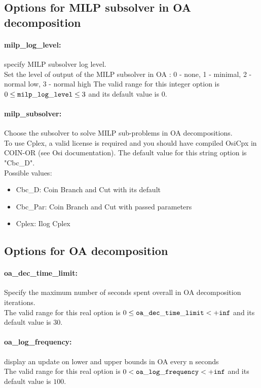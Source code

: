 \subsection{Options for MILP subsolver in OA decomposition}
\label{sec:Options_for_MILP_subsolver_in_OA_decomposition}
\paragraph{milp\_log\_level:} specify MILP subsolver log level. $\;$ \\
 Set the level of output of the MILP subsolver in
OA : 0 - none, 1 - minimal, 2 - normal low, 3 -
normal high The valid range for this integer option is
$0 \le {\tt milp\_log\_level } \le 3$
and its default value is $0$.


\paragraph{milp\_subsolver:} Choose the subsolver to solve MILP sub-problems in OA decompositions. $\;$ \\
  To use Cplex, a valid license is required and
you should have compiled OsiCpx in COIN-OR  (see
Osi documentation).
The default value for this string option is "Cbc\_D".
\\ 
Possible values:
\begin{itemize}
   \item Cbc\_D: Coin Branch and Cut with its default
   \item Cbc\_Par: Coin Branch and Cut with passed parameters
   \item Cplex: Ilog Cplex
\end{itemize}

\subsection{Options for OA decomposition}
\label{sec:Options_for_OA_decomposition}
\paragraph{oa\_dec\_time\_limit:} Specify the maximum number of seconds spent overall in OA decomposition iterations. $\;$ \\
 The valid range for this real option is 
$0 \le {\tt oa\_dec\_time\_limit } <  {\tt +inf}$
and its default value is $30$.


\paragraph{oa\_log\_frequency:} display an update on lower and upper bounds in OA every n seconds $\;$ \\
 The valid range for this real option is 
$0 <  {\tt oa\_log\_frequency } <  {\tt +inf}$
and its default value is $100$.


